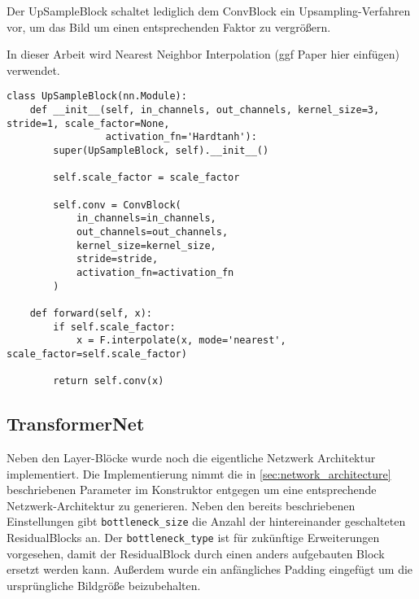 Der UpSampleBlock schaltet lediglich dem ConvBlock ein Upsampling-Verfahren vor, um das Bild um einen entsprechenden Faktor zu vergrößern.

In dieser Arbeit wird Nearest Neighbor Interpolation (ggf Paper hier einfügen) verwendet.


\begin{listing}[ht]
\begin{verbatim}
class UpSampleBlock(nn.Module):
    def __init__(self, in_channels, out_channels, kernel_size=3, stride=1, scale_factor=None,
                 activation_fn='Hardtanh'):
        super(UpSampleBlock, self).__init__()

        self.scale_factor = scale_factor

        self.conv = ConvBlock(
            in_channels=in_channels,
            out_channels=out_channels,
            kernel_size=kernel_size,
            stride=stride,
            activation_fn=activation_fn
        )

    def forward(self, x):
        if self.scale_factor:
            x = F.interpolate(x, mode='nearest', scale_factor=self.scale_factor)

        return self.conv(x)
\end{verbatim}
\end{listing}

\subsection{TransformerNet}

Neben den Layer-Blöcke wurde noch die eigentliche Netzwerk Architektur implementiert. Die Implementierung nimmt die in \ref{sec:network_architecture} beschriebenen Parameter im Konstruktor entgegen um eine entsprechende Netzwerk-Architektur zu generieren. Neben den bereits beschriebenen Einstellungen gibt \texttt{bottleneck_size} die Anzahl der hintereinander geschalteten ResidualBlocks an. Der \texttt{bottleneck_type} ist für zukünftige Erweiterungen vorgesehen, damit der ResidualBlock durch einen anders aufgebauten Block ersetzt werden kann. Außerdem wurde ein anfängliches Padding eingefügt um die ursprüngliche Bildgröße beizubehalten.

